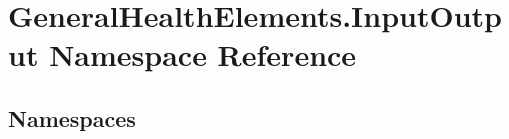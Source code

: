 \hypertarget{namespace_general_health_elements_1_1_input_output}{}\section{General\+Health\+Elements.\+Input\+Output Namespace Reference}
\label{namespace_general_health_elements_1_1_input_output}
\subsection*{Namespaces}
\begin{DoxyCompactItemize}
\end{DoxyCompactItemize}
